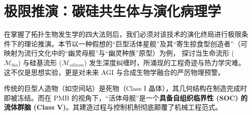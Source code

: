 \section{极限推演：碳硅共生体与演化病理学}
\label{sec:tb_extreme_deduction}

在掌握了拓扑生物发生学的四大法则后，我们必须对该技术的演化终局进行极限条件下的理论推演。本节以一种假想的“巨型活体星舰”及其“寄生掠食型创造者”（可映射为流行文化中的“幽灵母舰”与“幽灵种族”原型）为例，
探讨当生命流形 ($\mathcal{M}_{bio}$) 与硅基流形 ($\mathcal{M}_{silicon}$) 发生深度纠缠时，所涌现的工程奇迹与热力学灾难。这不仅是思想实验，更是对未来 AGI 与合成生物学融合的严厉物理预警。


传统的巨型人造物（如空间站）是死物（Class I 晶体），其几何结构在制造完成时即被冻结。而在 PMB 的视角下，“活体母舰”是一个\textbf{具备自组织临界性 (SOC) 的流体群脑 (Class V)}。其建造过程与控制机制彻底颠覆了机械工程范式。

